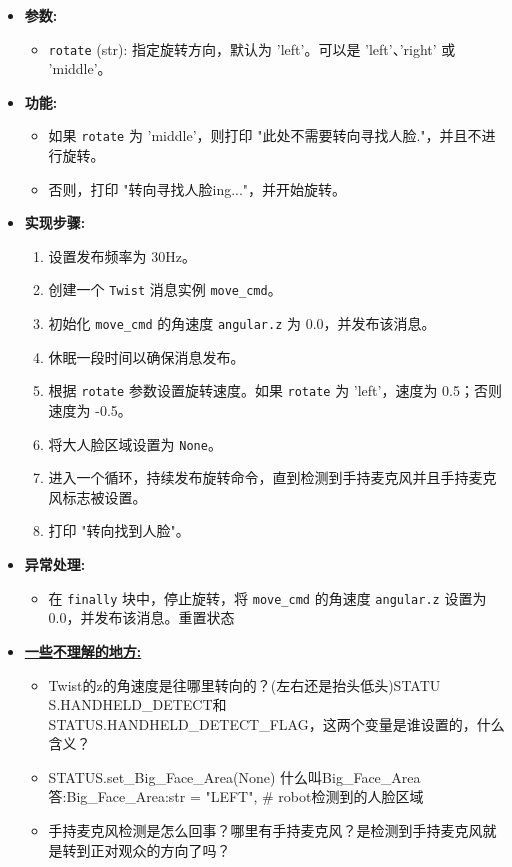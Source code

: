 \documentclass[]{article}
\begin{document}
\begin{itemize}
	\item \textbf{参数:}
	\begin{itemize}
		\item \texttt{rotate} (str): 指定旋转方向，默认为 'left'。可以是 'left'、'right' 或 'middle'。
	\end{itemize}
	\item \textbf{功能:}
	\begin{itemize}
		\item 如果 \texttt{rotate} 为 'middle'，则打印 "此处不需要转向寻找人脸."，并且不进行旋转。
		\item 否则，打印 "转向寻找人脸ing..."，并开始旋转。
	\end{itemize}
	\item \textbf{实现步骤:}
	\begin{enumerate}
		\item 设置发布频率为 30Hz。
		\item 创建一个 \texttt{Twist} 消息实例 \texttt{move\_cmd}。
		\item 初始化 \texttt{move\_cmd} 的角速度 \texttt{angular.z} 为 0.0，并发布该消息。
		\item 休眠一段时间以确保消息发布。
		\item 根据 \texttt{rotate} 参数设置旋转速度。如果 \texttt{rotate} 为 'left'，速度为 0.5；否则速度为 -0.5。
		\item 将大人脸区域设置为 \texttt{None}。
		\item 进入一个循环，持续发布旋转命令，直到检测到手持麦克风并且手持麦克风标志被设置。
		\item 打印 "转向找到人脸"。
	\end{enumerate}
	\item \textbf{异常处理:}
	\begin{itemize}
		\item 在 \texttt{finally} 块中，停止旋转，将 \texttt{move\_cmd} 的角速度 \texttt{angular.z} 设置为 0.0，并发布该消息。重置状态
	\end{itemize}
	\item \textbf{\underline{一些不理解的地方:}}
	\begin{itemize}
		\item \textcolor{mycolor}{Twist的z的角速度是往哪里转向的？(左右还是抬头低头)STATU \\ S.HANDHELD\_DETECT和 STATUS.HANDHELD\_DETECT\_FLAG，这两个变量是谁设置的，什么含义？}
		\item 
		STATUS.set\_Big\_Face\_Area(None) 什么叫Big\_Face\_Area
		\\答:Big\_Face\_Area:str = "LEFT",                     \# robot检测到的人脸区域
		\item \textcolor{mycolor}{手持麦克风检测是怎么回事？哪里有手持麦克风？是检测到手持麦克风就是转到正对观众的方向了吗？}
	\end{itemize}
\end{itemize}
\end{document}
